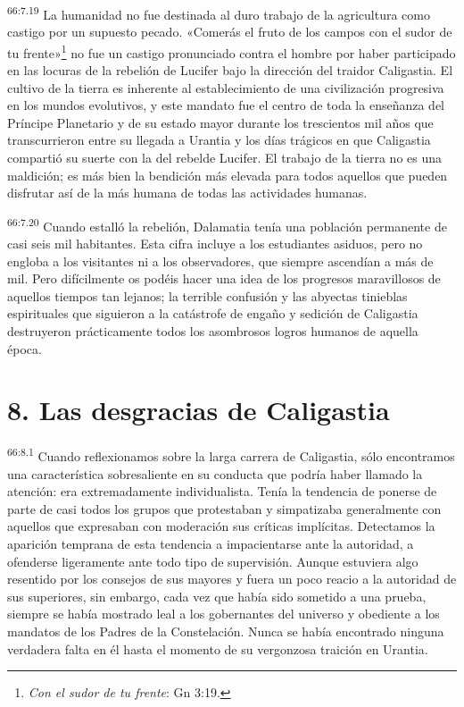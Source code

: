 \par
\textsuperscript{66:7.19} La humanidad no fue destinada al duro trabajo de la agricultura como castigo por un supuesto pecado. «Comerás el fruto de los campos con el sudor de tu frente»\footnote{\textit{Con el sudor de tu frente}: Gn 3:19.} no fue un castigo pronunciado contra el hombre por haber participado en las locuras de la rebelión de Lucifer bajo la dirección del traidor Caligastia. El cultivo de la tierra es inherente al establecimiento de una civilización progresiva en los mundos evolutivos, y este mandato fue el centro de toda la enseñanza del Príncipe Planetario y de su estado mayor durante los trescientos mil años que transcurrieron entre su llegada a Urantia y los días trágicos en que Caligastia compartió su suerte con la del rebelde Lucifer. El trabajo de la tierra no es una maldición; es más bien la bendición más elevada para todos aquellos que pueden disfrutar así de la más humana de todas las actividades humanas.

\par
\textsuperscript{66:7.20} Cuando estalló la rebelión, Dalamatia tenía una población permanente de casi seis mil habitantes. Esta cifra incluye a los estudiantes asiduos, pero no engloba a los visitantes ni a los observadores, que siempre ascendían a más de mil. Pero difícilmente os podéis hacer una idea de los progresos maravillosos de aquellos tiempos tan lejanos; la terrible confusión y las abyectas tinieblas espirituales que siguieron a la catástrofe de engaño y sedición de Caligastia destruyeron prácticamente todos los asombrosos logros humanos de aquella época.

\section*{8. Las desgracias de Caligastia}
\par
\textsuperscript{66:8.1} Cuando reflexionamos sobre la larga carrera de Caligastia, sólo encontramos una característica sobresaliente en su conducta que podría haber llamado la atención: era extremadamente individualista. Tenía la tendencia de ponerse de parte de casi todos los grupos que protestaban y simpatizaba generalmente con aquellos que expresaban con moderación sus críticas implícitas. Detectamos la aparición temprana de esta tendencia a impacientarse ante la autoridad, a ofenderse ligeramente ante todo tipo de supervisión. Aunque estuviera algo resentido por los consejos de sus mayores y fuera un poco reacio a la autoridad de sus superiores, sin embargo, cada vez que había sido sometido a una prueba, siempre se había mostrado leal a los gobernantes del universo y obediente a los mandatos de los Padres de la Constelación. Nunca se había encontrado ninguna verdadera falta en él hasta el momento de su vergonzosa traición en Urantia.

